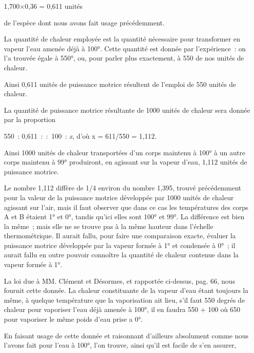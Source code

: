 \documentclass[french,twoside]{book} %
\begin{document}
\begin{center}
1,700×0,36 = 0,611 unités\par
\end{center}

\noindent de l’espèce dont nous avons fait usage précédemment.\par
La quantité de chaleur employée est la quantité nécessaire pour transformer en vapeur l’eau amenée déjà à 100°. Cette quantité est donnée par l’expérience : on l’a trouvée égale à 550°, ou, pour parler plus exactement, à 550 de nos unités de chaleur.\par
Ainsi 0,611 unités de puissance motrice résultent de l’emploi de 550 unités de chaleur.\par
La quantité de puissance motrice résultante de 1000 unités de chaleur sera donnée par la proportion\par

\begin{center}
550 : 0,611 : : 100 : \emph{x}, d’où x = 611/550 = 1,112.\par
\end{center}

\noindent Ainsi 1000 unités de chaleur transportées d’un corps maintenu à 100° à un autre corps maintenu à 99° produiront, en agissant sur la vapeur d’eau, 1,112 unités de puissance motrice.\par
Le nombre 1,112 diffère de 1/4 environ du nombre 1,395, trouvé précédemment pour la valeur de la puissance motrice développée par 1000 unités de chaleur agissant sur l’air, mais il faut observer que dans ce cas les températures des corps A et B étaient 1° et 0°, tandis qu’ici elles sont 100° et 99°. La différence est bien la même ; mais elle ne se trouve pas à la même hauteur dans l’échelle thermométrique. Il aurait fallu, pour faire une comparaison exacte, évaluer la puissance motrice développée par la vapeur formée à 1° et condensée à 0° ; il aurait fallu en outre pouvoir connoître la quantité de chaleur contenue dans la vapeur formée à 1°.\par
La loi due à MM. Clément et Désormes, et rapportée ci-dessus, pag. 66, nous fournit cette donnée. La chaleur constituante de la vapeur d’eau étant toujours la même, à quelque température que la vaporisation ait lieu, s’il faut 550 degrés de chaleur pour vaporiser l’eau déjà amenée à 100°, il en faudra 550 + 100 où 650 pour vaporiser le même poids d’eau prise a 0°.\par
En faisant usage de cette donnée et raisonnant d’ailleurs absolument comme nous l’avons fait pour l’eau à 100°, l’on trouve, ainsi qu’il est facile de s’en assurer,\par
\end{document}
